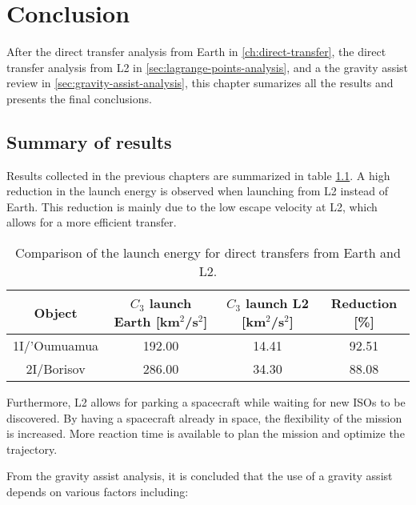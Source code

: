 \chapter{Conclusion}

After the direct transfer analysis from Earth in \ref{ch:direct-transfer}, the
direct transfer analysis from L2 in \ref{sec:lagrange-points-analysis}, and a
the gravity assist review in \ref{sec:gravity-assist-analysis}, this chapter
sumarizes all the results and presents the final conclusions.

\section{Summary of results}

Results collected in the previous chapters are summarized in table
\ref{tab:summary-results-c3}. A high reduction in the launch energy is observed
when launching from L2 instead of Earth. This reduction is mainly due to the low
escape velocity at L2, which allows for a more efficient transfer.

\vspace{1cm}
\begin{table}[H]
  \centering
  \begin{tabular}{|c|c|c|c|}
    \hline
    Object       & $C_3$ launch Earth [km$^2$/s$^2$] & $C_3$ launch L2 [km$^2$/s$^2$] & Reduction [\%] \\
    \hline
    1I/'Oumuamua & 192.00                            & 14.41                          & 92.51          \\
    \hline
    2I/Borisov   & 286.00                            & 34.30                          & 88.08          \\
    \hline
  \end{tabular}
  \caption[Comparison of the launch energy for direct transfers from Earth and
    L2.]{Comparison of the launch energy for direct transfers from Earth and L2.}
  \label{tab:summary-results-c3}
\end{table}

Furthermore, L2 allows for parking a spacecraft while waiting for new ISOs to be
discovered. By having a spacecraft already in space, the flexibility of the
mission is increased. More reaction time is available to plan the mission and
optimize the trajectory.

From the gravity assist analysis, it is concluded that the use of a gravity
assist depends on various factors including:

